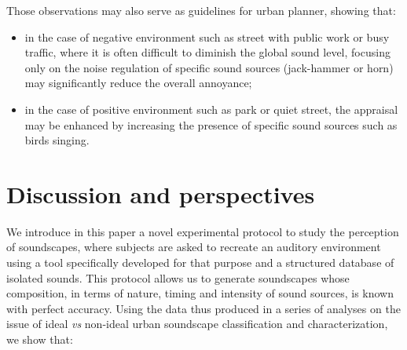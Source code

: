 \documentclass[twoside,twocolumn]{article}
\begin{document}
Those observations may also serve as guidelines for urban planner, showing that:

\begin{itemize}
\item in the case of negative environment such as street with public work or busy traffic, where it is often difficult to diminish the global sound level, focusing only on the noise regulation of specific sound sources (jack-hammer or horn) may significantly reduce the overall annoyance;
\item in the case of positive environment such as park or quiet street, the appraisal may be enhanced by increasing the presence of specific sound sources such as birds singing.
\end{itemize}


\section{Discussion and perspectives}


We introduce in this paper a novel experimental protocol to study the perception of soundscapes, where subjects are asked to recreate an auditory environment using a tool specifically developed for that purpose and a structured database of isolated sounds. This protocol allows us to generate soundscapes whose composition, in terms of nature, timing and intensity of sound sources, is known with perfect accuracy. Using the data thus produced in a series of analyses on the issue of ideal \emph{vs} non-ideal urban soundscape classification and characterization, we show that:
\end{document}

